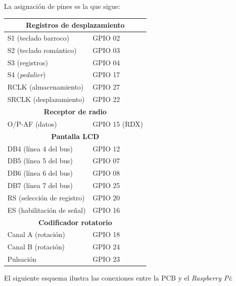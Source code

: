 La asignación de pines es la que sigue:

\smallskip

\begin{center}
	\begin{tabular}{|l|l|}
		\hline \multicolumn{2}{|c|}{\textbf{Registros de desplazamiento}} \\
		\hline S1 (teclado barroco) & \acrshort{GPIO} 02 \\ 
		\hline S2 (teclado romántico) & \acrshort{GPIO} 03 \\ 
		\hline S3 (registros) & \acrshort{GPIO} 04 \\ 
		\hline S4 (\textit{pedalier}) & \acrshort{GPIO} 17 \\ 
		\hline RCLK (almacenamiento) & \acrshort{GPIO} 27 \\ 
		\hline SRCLK (desplazamiento) & \acrshort{GPIO} 22 \\ 
		\hline \multicolumn{2}{|c|}{\textbf{Receptor de radio}} \\
		\hline O/P-AF (datos) & \acrshort{GPIO} 15 (RDX) \\ 
		\hline \multicolumn{2}{|c|}{\textbf{Pantalla \acrshort{LCD}}} \\
		\hline DB4 (línea 4 del bus) & \acrshort{GPIO} 12 \\ 
		\hline DB5 (línea 5 del bus) & \acrshort{GPIO} 07 \\ 
		\hline DB6 (línea 6 del bus) & \acrshort{GPIO} 08 \\ 
		\hline DB7 (línea 7 del bus) & \acrshort{GPIO} 25 \\
		\hline RS (selección de registro) & \acrshort{GPIO} 20 \\ 
		\hline ES (habilitación de señal) & \acrshort{GPIO} 16 \\ 
		\hline \multicolumn{2}{|c|}{\textbf{Codificador rotatorio}} \\
		\hline Canal A (rotación) & \acrshort{GPIO} 18 \\ 
		\hline Canal B (rotación) & \acrshort{GPIO} 24 \\ 
		\hline Pulsación & \acrshort{GPIO} 23 \\ 
		\hline 
	\end{tabular}
	\smallskip
\end{center}

\smallskip

El siguiente esquema ilustra las conexiones entre la \acrshort{PCB} y el \textit{Raspberry Pi}:

